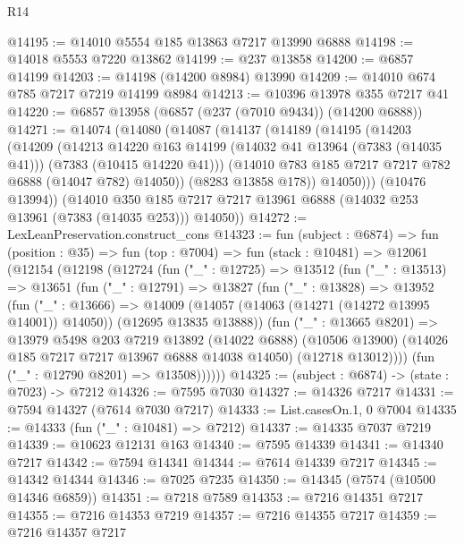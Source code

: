 \begin{lexlean}{R14}
\begin{coremodule}
@14195 := @14010 @5554 @185 @13863 @7217 @13990 @6888
@14198 := @14018 @5553 @7220 @13862
@14199 := @237 @13858
@14200 := @6857 @14199
@14203 := @14198 (@14200 @8984) @13990
@14209 := @14010 @674 @785 @7217 @7219 @14199 @8984
@14213 := @10396 @13978 @355 @7217 @41
@14220 := @6857 @13958 (@6857 (@237 (@7010 @9434)) (@14200 @6888))
@14271 := @14074
    (@14080
      (@14087
        (@14137
          (@14189
            (@14195
              (@14203
                (@14209
                  (@14213
                    @14220
                    @163
                    @14199
                    (@14032 @41 @13964 (@7383 (@14035 @41)))
                    (@7383 (@10415 @14220 @41)))
                  (@14010 @783 @185 @7217 @7217 @782 @6888 (@14047 @782) @14050))
                (@8283 @13858 @178))
              @14050)))
        (@10476 @13994))
      (@14010 @350 @185 @7217 @7217 @13961 @6888 (@14032 @253 @13961 (@7383 (@14035 @253))) @14050))
@14272 := LexLeanPreservation.construct_cons
@14323 := fun (subject : @6874) =>
  fun (position : @35) =>
  fun (top : @7004) =>
  fun (stack : @10481) =>
  @12061
    (@12154
      (@12198
        (@12724
          (fun ("_" : @12725) =>
          @13512
            (fun ("_" : @13513) =>
            @13651
              (fun ("_" : @12791) =>
              @13827
                (fun ("_" : @13828) =>
                @13952
                  (fun ("_" : @13666) =>
                  @14009
                    (@14057 (@14063 (@14271 (@14272 @13995 @14001)) @14050))
                    (@12695 @13835 @13888))
                  (fun ("_" : @13665 @8201) =>
                  @13979
                    @5498
                    @203
                    @7219
                    @13892
                    (@14022 @6888)
                    (@10506 @13900)
                    (@14026 @185 @7217 @7217 @13967 @6888 @14038 @14050)
                    (@12718 @13012))))
              (fun ("_" : @12790 @8201) => @13508))))))
@14325 := (subject : @6874) -> (state : @7023) -> @7212
@14326 := @7595 @7030
@14327 := @14326 @7217
@14331 := @7594 @14327 (@7614 @7030 @7217)
@14333 := List.casesOn.{1, 0} @7004
@14335 := @14333 (fun ("_" : @10481) => @7212)
@14337 := @14335 @7037 @7219
@14339 := @10623 @12131 @163
@14340 := @7595 @14339
@14341 := @14340 @7217
@14342 := @7594 @14341
@14344 := @7614 @14339 @7217
@14345 := @14342 @14344
@14346 := @7025 @7235
@14350 := @14345 (@7574 (@10500 @14346 @6859))
@14351 := @7218 @7589
@14353 := @7216 @14351 @7217
@14355 := @7216 @14353 @7219
@14357 := @7216 @14355 @7217
@14359 := @7216 @14357 @7217

\end{coremodule}
\end{lexlean}
